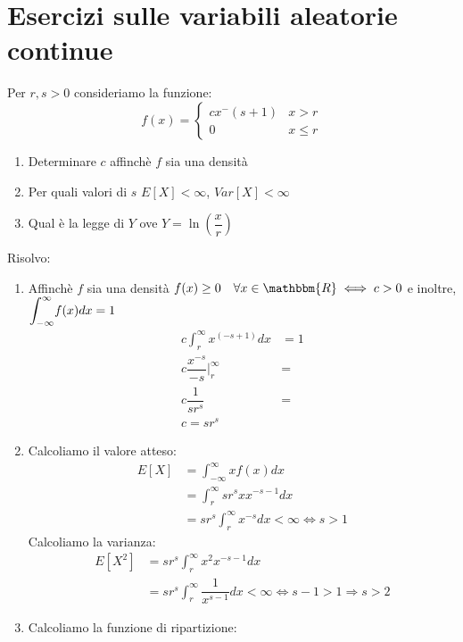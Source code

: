 \documentclass[12pt]{report}
\newcounter{exercise}
\begin{document}
	 \section{Esercizi sulle variabili aleatorie continue}
	 \begin{exercise}{}{}
	 	\begin{assignment}{}{}
	 		Per $r, s > 0$ consideriamo la funzione:
	 		\[
	 		f(x) = \begin{cases}
	 			cx^-(s + 1) & x > r \\
	 			0 & x \leq r
	 		\end{cases}
	 		\]
	 		\begin{enumerate}
	 			\item Determinare $c$ affinchè $f$ sia una densità
	 			\item Per quali valori di $s$ $E[X] < \infty$, $Var[X] < \infty$
	 			\item Qual è la legge di $Y$ ove $Y = \ln(\dfrac{x}{r})$
	 		\end{enumerate}
	 	\end{assignment}
	 	Risolvo:
	 	\begin{enumerate}
	 		\item Affinchè $f$ sia una densità $f(x) \geq 0 \quad \forall x \in \mathbbm{R} \iff c > 0$ e inoltre, $\mathlarger{\int_{-\infty}^{\infty}}f(x)dx = 1$
	 		\begin{align*}
	 			c\int_{r}^{\infty}x^{(-s + 1)}dx &= 1 \\
	 			c\dfrac{x^{-s}}{-s} \Big|^{\infty}_{r} &= \\
	 			c \dfrac{1}{sr^s} &= \\
	 			c = sr^s
	 		\end{align*}
	 		\item Calcoliamo il valore atteso:
	 		\begin{align*}
	 			E[X] &= \int_{-\infty}^{\infty}xf(x)dx \\
	 			&= \int_{r}^{\infty}sr^sxx^{-s-1}dx \\
	 			&= sr^s\int_{r}^{\infty}x^{-s}dx < \infty \iff s > 1
	 		\end{align*}
	 		Calcoliamo la varianza:
	 		\begin{align*}
	 			E[X^2] &= sr^s\int_{r}^{\infty}x^2x^{-s-1}dx \\
	 			&= sr^s\int_{r}^{\infty}\dfrac{1}{x^{s-1}}dx < \infty \iff s - 1 > 1 \Rightarrow s>2
	 		\end{align*}
	 		\item Calcoliamo la funzione di ripartizione:
	 		\begin{align*}

\end{align*}
\end{enumerate}
\end{exercise}
\end{document}
